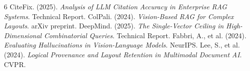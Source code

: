 \documentclass[11pt]{article}
\begin{document}

\begin{thebibliography}{6}
 CiteFix. (2025). \emph{Analysis of LLM Citation Accuracy in Enterprise RAG Systems}. Technical Report.
 ColPali. (2024). \emph{Vision-Based RAG for Complex Layouts}. arXiv preprint.
 DeepMind. (2025). \emph{The Single-Vector Ceiling in High-Dimensional Combinatorial Queries}. Technical Report.
 Fabbri, A., et al. (2024). \emph{Evaluating Hallucinations in Vision-Language Models}. NeurIPS.
 Lee, S., et al. (2024). \emph{Logical Provenance and Layout Retention in Multimodal Document AI}. CVPR.
\end{thebibliography}
\end{document}
